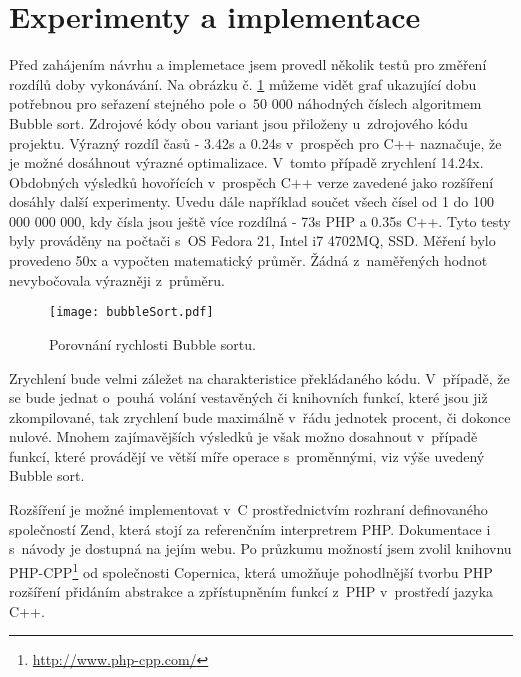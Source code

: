 \documentclass[czech]{ExcelAtFIT}
\begin{document}
\section{Experimenty a implementace}

	Před zahájením návrhu a implemetace jsem provedl několik testů pro změření rozdílů doby vykonávání. Na obrázku č. \ref{fig:bubbleSort} můžeme vidět graf ukazující dobu potřebnou pro seřazení stejného pole o~50 000 ná\-hod\-ných číslech algoritmem Bubble sort. Zdrojové kódy obou variant jsou přiloženy u~zdrojového kódu projektu. Výrazný rozdíl časů - 3.42s a 0.24s v~prospěch pro C++ naznačuje, že je možné dosáhnout výrazné optimalizace. V~tomto případě zrychlení 14.24x. Obdobných výsledků hovořících v~prospěch C++ verze zavedené jako rozšíření dosáhly další experimenty. U\-ve\-du dále například součet všech čísel od 1 do 100 000 000 000, kdy čísla jsou ještě více rozdílná - 73s PHP a 0.35s C++. Tyto testy byly prováděny na počtači s~OS Fedora 21, Intel i7 4702MQ, SSD. Měření bylo provedeno 50x a vypočten matematický průměr. Žádná z~naměřených hodnot nevybočovala výrazněji z~prů\-mě\-ru.


\begin{figure}[t]
	\centering
	\texttt{[image: bubbleSort.pdf]}
	\caption{Porovnání rychlosti Bubble sortu.}
	\label{fig:bubbleSort}
\end{figure}

	Zrychlení bude velmi záležet na charakteristice překládaného kódu. V~případě, že se bude jednat o~pouhá volání vestavěných či knihovních funkcí, které jsou již zkompilované, tak zrychlení bude ma\-xi\-mál\-ně v~řádu jednotek procent, či dokonce nulové. Mnohem zajímavějších výsledků je však možno dosahnout v~případě funkcí, které provádějí ve větší míře operace s~proměnnými, viz výše uvedený Bubble sort.

	Rozšíření je možné implementovat v~C pro\-střed\-nic\-tvím rozhraní definovaného společností Zend, která stojí za referenčním interpretrem PHP. Dokumentace i s~návody je dostupná na jejím webu. Po průzkumu možností jsem zvolil knihovnu PHP-CPP\footnote{\url{http://www.php-cpp.com/}} od spo\-leč\-nos\-ti Copernica, která umožňuje pohodlnější tvorbu PHP rozšíření přidáním abstrakce a zpřístupněním funkcí z~PHP v~prostředí jazyka C++.
\end{document}
